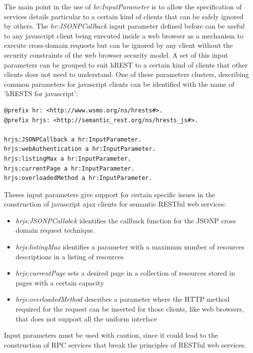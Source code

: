 The main point in the use of \emph{hr:InputParameter} is to allow the specification of services details particular to a certain kind of clients that can be safely ignored by others. The \emph{hr:JSONPCallback} input parameter defined before can be useful to any javascript client being executed inside a web browser as a mechanism to execute cross-domain requests but can be ignored by any client without the security constraints of the web browser security model. A set of this input parameters can be grouped to suit hREST to a certain kind of clients that other clients does not need to understand. One of these parameters clusters, describing common parameters for javascript clients can be identified with the name of 'hRESTS for javascript':
\vspace{5 mm}
\begin{lstlisting}
@prefix hr: <http://www.wsmo.org/ns/hrests#>. 
@prefix hrjs: <http://semantic_rest.org/ns/hrests_js#>. 

hrjs:JSONPCallback a hr:InputParameter.
hrjs:webAuthentication a hr:InputParameter.
hrjs:listingMax a hr:InputParameter.
hrjs:currentPage a hr:InputParameter.
hrjs:overloadedMethod a hr:InputParameter.
\end{lstlisting} \vspace{5 mm}

Theses input parameters give support for certain specific issues in the construction of javascript ajax clients for semantic RESTful web services:

\begin{itemize}
  \item \emph{hrjs:JSONPCallabck} identifies the callback function for the JSONP cross domain request technique.
  \item \emph{hrjs:listingMax} identifies a parameter with a maximum number of resources descriptions in a listing of resources
  \item \emph{hrjs:currentPage} sets a desired page in a collection of resources stored in pages with a certain capacity
  \item \emph{hrjs:overloadedMethod} describes a parameter where the HTTP method required for the request can be inserted for those clients, like web browsers, that does not support all the uniform interface
\end{itemize}

Input parameters must be used with caution, since it could lead to the construction of RPC services that break the principles of RESTful web services.

